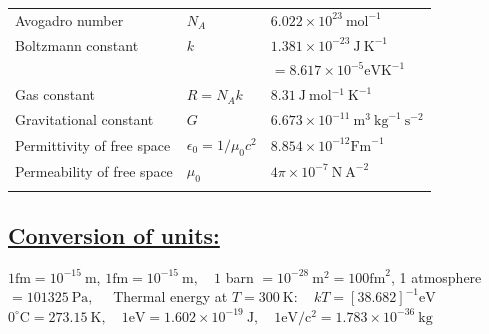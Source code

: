 \documentclass[a4paper,12pt]{article}
\begin{document}
\begin{tabular}{lll}
\hline Avogadro number & $N_{A}$ & $6.022 \times 10^{23} \mathrm{~mol}^{-1}$ \\
Boltzmann constant & $k$ & $1.381 \times 10^{-23} \mathrm{~J} \mathrm{~K}^{-1}$ \\
& & $=8.617 \times 10^{-5} \mathrm{eV} \mathrm{K}^{-1}$ \\
Gas constant & $R=N_{A} k$ & $8.31 \mathrm{~J} \mathrm{~mol}{ }^{-1} \mathrm{~K}^{-1}$ \\
Gravitational constant & $G$ & $6.673 \times 10^{-11} \mathrm{~m}^{3} \mathrm{~kg}^{-1} \mathrm{~s}^{-2}$ \\
Permittivity of free space & $\epsilon_{0}=1 / \mu_{0} c^{2}$ & $8.854 \times 10^{-12} \mathrm{Fm}^{-1}$ \\
Permeability of free space & $\mu_{0}$ & $4 \pi \times 10^{-7} \mathrm{~N} \mathrm{~A}^{-2}$ \\
\hline & &
\end{tabular}
\subsection*{\underline{Conversion of units:}}
$1 \mathrm{fm}=10^{-15} \mathrm{~m}$, $1 \mathrm{fm}=10^{-15} \mathrm{~m}, \quad 1$ barn $=10^{-28} \mathrm{~m}^{2}=100 \mathrm{fm}^{2}$, 1 atmosphere $=101325 \mathrm{~Pa}, \quad$ Thermal energy at $T=300 \mathrm{~K}: \quad k T=[38.682]^{-1} \mathrm{eV}$ $0^{\circ} \mathrm{C}=273.15 \mathrm{~K}, \quad 1 \mathrm{eV}=1.602 \times 10^{-19} \mathrm{~J}, \quad 1 \mathrm{eV} / \mathrm{c}^{2}=1.783 \times 10^{-36} \mathrm{~kg}$
\end{document}
